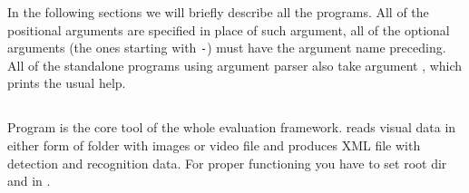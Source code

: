 In the following sections we will briefly describe all the programs. All of the positional arguments are specified in place of such argument, all of the optional arguments (the ones starting with \texttt{-}) must have the argument name preceding. All of the standalone programs using argument parser also take argument , which prints the usual help.

\subsection{} \label{rec}
Program  is the core tool of the whole evaluation framework.  reads visual data in either form of folder with images or video file and produces XML file with detection and recognition data. For proper functioning you have to set  root dir and  in \hyperref[init]{}.

